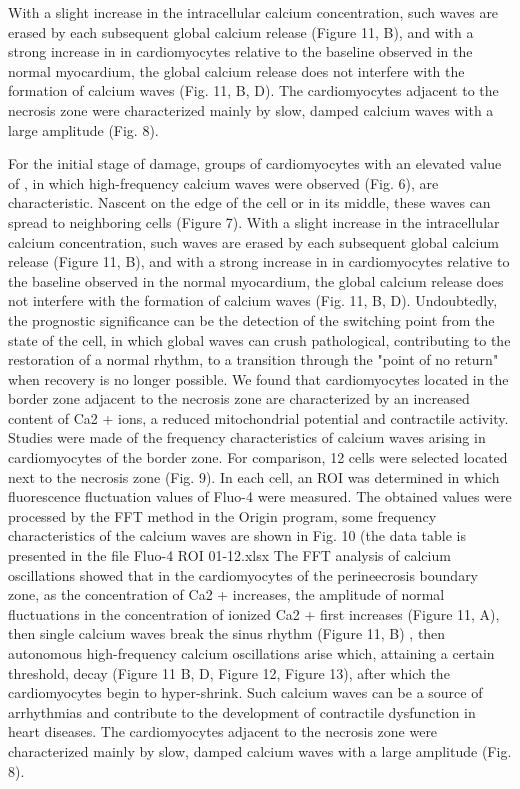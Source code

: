 \documentclass{biophys-new}
\begin{document}
 With a slight increase in the intracellular calcium concentration, such waves are erased by each subsequent global calcium release (Figure 11, B), and with a strong increase in  in cardiomyocytes relative to the baseline observed in the normal myocardium, the global calcium release does not interfere with the formation of calcium waves (Fig. 11, B, D). The cardiomyocytes adjacent to the necrosis zone were characterized mainly by slow, damped calcium waves with a large amplitude (Fig. 8).

 For the initial stage of damage, groups of cardiomyocytes with an elevated value of , in which high-frequency calcium waves were observed (Fig. 6), are characteristic. Nascent on the edge of the cell or in its middle, these waves can spread to neighboring cells (Figure 7). With a slight increase in the intracellular calcium concentration, such waves are erased by each subsequent global calcium release (Figure 11, B), and with a strong increase in  in cardiomyocytes relative to the baseline observed in the normal myocardium, the global calcium release does not interfere with the formation of calcium waves (Fig. 11, B, D). Undoubtedly, the prognostic significance can be the detection of the switching point from the state of the cell, in which global waves can crush pathological, contributing to the restoration of a normal rhythm, to a transition through the "point of no return" when recovery is no longer possible.
 We found that cardiomyocytes located in the border zone adjacent to the necrosis zone are characterized by an increased content of Ca2 + ions, a reduced mitochondrial potential and contractile activity. Studies were made of the frequency characteristics of calcium waves arising in cardiomyocytes of the border zone. For comparison, 12 cells were selected located next to the necrosis zone (Fig. 9). In each cell, an ROI was determined in which fluorescence fluctuation values of Fluo-4 were measured. The obtained values were processed by the FFT method in the Origin program, some frequency characteristics of the calcium waves are shown in Fig. 10 (the data table is presented in the file Fluo-4 ROI 01-12.xlsx
 The FFT analysis of calcium oscillations showed that in the cardiomyocytes of the perineecrosis boundary zone, as the concentration of Ca2 + increases, the amplitude of normal fluctuations in the concentration of ionized Ca2 + first increases (Figure 11, A), then single calcium waves break the sinus rhythm (Figure 11, B) ,
 then autonomous high-frequency calcium oscillations arise which, attaining a certain threshold, decay (Figure 11 B, D, Figure 12, Figure 13), after which the cardiomyocytes begin to hyper-shrink. Such calcium waves can be a source of arrhythmias and contribute to the development of contractile dysfunction in heart diseases.
 The cardiomyocytes adjacent to the necrosis zone were characterized mainly by slow, damped calcium waves with a large amplitude (Fig. 8).
\end{document}
